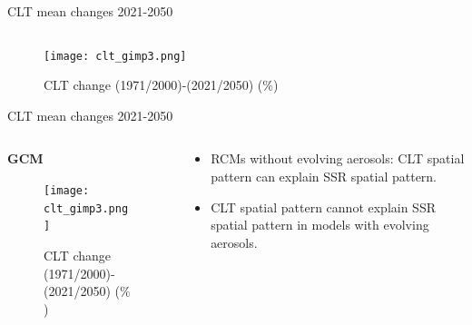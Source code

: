 \documentclass{beamer}%
\begin{document}
\begin{frame}[fragile]{CLT mean changes 2021-2050}
\vspace{1\baselineskip}
\begin{columns}
  \begin{column}{0.4\textwidth}
      \end{column}
      \begin{column}{0.7\textwidth}
   \end{column}
   \end{columns}
    \begin{figure}
      \texttt{[image: clt\_gimp3.png]}
        \centering\caption{CLT change (1971/2000)-(2021/2050) ($\%$)}
      \end{figure}
\end{frame}
 
\begin{frame}[fragile]{CLT mean changes 2021-2050}
\vspace{1\baselineskip}
\begin{columns}
  \begin{column}{0.7\textwidth}
    \hspace{2\baselineskip}\LARGE{\textbf{GCM}}
    \begin{figure}
      \texttt{[image: clt\_gimp3.png]}
        \centering\caption{CLT change (1971/2000)-(2021/2050) ($\%$)}
    \end{figure}
  \end{column}
  \begin{column}{0.4\textwidth}
      \begin{itemize}
        \centering\vspace{0.05\baselineskip}\item RCMs without evolving aerosols: CLT spatial pattern can explain SSR spatial pattern.
        \centering\item CLT spatial pattern cannot explain SSR spatial pattern in models with evolving aerosols.
      \end{itemize}
    \end{column}
    \end{columns}
\end{frame}
\end{document}
